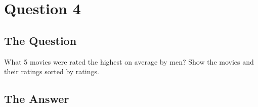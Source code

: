 \section{Question 4}

\subsection{The Question}

\begin{flushleft}

What 5 movies were rated the highest on average by men? Show
the movies and their ratings sorted by ratings.

\end{flushleft}
\subsection{The Answer}
